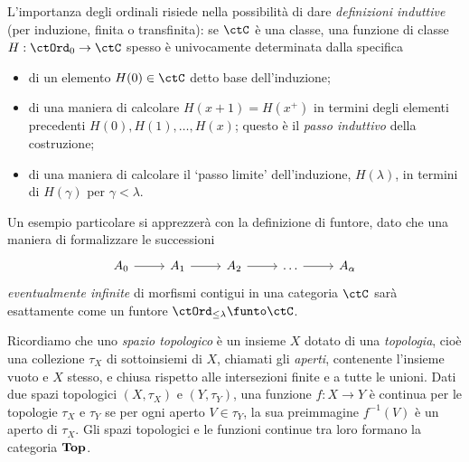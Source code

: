 \begin{remark}
	L'importanza degli ordinali risiede nella possibilità di dare \emph{definizioni induttive} (per induzione, finita o transfinita): se \(\ctC\) è una classe, una funzione di classe \(H : \ctOrd_0\to\ctC\) spesso è univocamente determinata dalla specifica
	\begin{itemize}
		\item di un elemento \(H(0)\in\ctC\) detto base dell'induzione;
		\item di una maniera di calcolare \(H(x+1)=H(x^+)\) in termini degli elementi precedenti \(H(0), H(1),\dots,H(x)\); questo è il \emph{passo induttivo} della costruzione;
		\item di una maniera di calcolare il `passo limite' dell'induzione, \(H(\lambda)\), in termini di \(H(\gamma)\) per \(\gamma < \lambda\).
	\end{itemize}
	Un esempio particolare si apprezzerà con la definizione di funtore, dato che una maniera di formalizzare le successioni
	\[\begin{tikzcd}
			A_0 \ar[r] & A_1 \ar[r] & A_2 \ar[r] & \dots \ar[r] & A_\alpha
		\end{tikzcd}\]
	\emph{eventualmente infinite} di morfismi contigui in una categoria \(\ctC\) sarà esattamente come un funtore \(\ctOrd_{\le\lambda}\funto \ctC\).
\end{remark}
\begin{example}\label{ex_cat_top}
	Ricordiamo che uno \emph{spazio topologico} è un insieme \(X\) dotato di una \emph{topologia}, cioè una collezione \(\tau_X\) di sottoinsiemi di \(X\), chiamati gli \emph{aperti}, contenente l'insieme vuoto e \(X\) stesso, e chiusa rispetto alle intersezioni finite e a tutte le unioni.
	Dati due spazi topologici \((X,\tau_X)\) e \((Y,\tau_Y)\), una funzione \(f:X\to Y\) è continua per le topologie \(\tau_X\) e \(\tau_Y\) se per ogni aperto \(V\in\tau_Y\), la sua preimmagine \(f^{-1}(V)\) è un aperto di \(\tau_X\).
	Gli spazi topologici e le funzioni continue tra loro formano la categoria \(\mathbf{Top}\).
\end{example}

